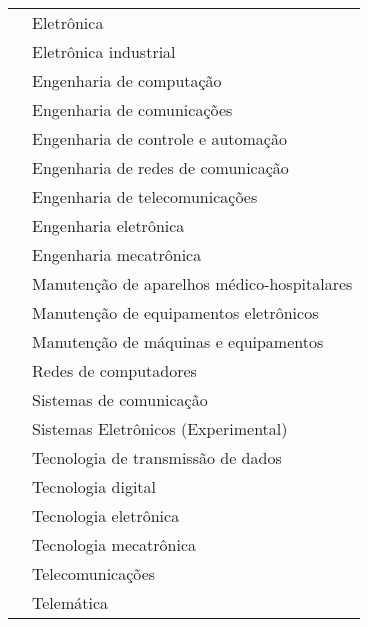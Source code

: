 \documentclass[grad,numbers]{coppe}
\begin{document}
\begin{table}[]
\begin{tabular}{|r||l||}
			                                         & Eletrônica                                     \\
			                                         & Eletrônica industrial                          \\
			                                         & Engenharia de computação                       \\
			                                         & Engenharia de comunicações                     \\
			                                         & Engenharia de controle e automação             \\
			                                         & Engenharia de redes de comunicação             \\
			                                         & Engenharia de telecomunicações                 \\
			                                         & Engenharia eletrônica                          \\
			                                         & Engenharia mecatrônica                         \\
			                                         & Manutenção de aparelhos médico-hospitalares    \\
			                                         & Manutenção de equipamentos eletrônicos         \\
			                                         & Manutenção de máquinas e equipamentos          \\
			                                         & Redes de computadores                          \\
			                                         & Sistemas de comunicação                        \\
			                                         & Sistemas Eletrônicos (Experimental)            \\
			                                         & Tecnologia de transmissão de dados             \\
			                                         & Tecnologia digital                             \\
			                                         & Tecnologia eletrônica                          \\
			                                         & Tecnologia mecatrônica                         \\
			                                         & Telecomunicações                               \\
			                                         & Telemática                                     \\ \hline
		\end{tabular}
	\end{table}
  	
\end{document}
